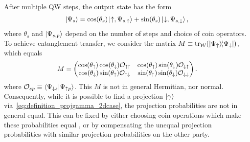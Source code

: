 \documentclass[
	aps, pra,
	superscriptaddress, twocolumn,
	floatfix,
	10pt
]{revtex4-1}
\newcommand{\parTitle}[1]{\noindent{\color{Mahogany}(\emph{#1})}}
\newcommand{\calO}{{\mathcal{O}}}
\newcommand{\calW}{{\mathcal{W}}}
\begin{document}
\parTitle{Multiple steps}
After multiple QW steps, the output state has the form
\begin{equation}
\begin{aligned}
	\ket{\Psi_s} =
	\cos(\theta_s) \ket{\uparrow,\Psi_{s,\uparrow}} +
	\sin(\theta_s) \ket{\downarrow,\Psi_{s,\downarrow}},
\end{aligned}
\end{equation}
where $\theta_s$ and $\ket{\Psi_{s,p}}$ depend on the number of steps and choice of coin operators.
To achieve entanglement transfer, we consider the matrix
$M\equiv \tr_{\calW}(\ketbra{\Psi_\uparrow}{\Psi_\downarrow})$,
which equals
\begin{equation}\scalebox{0.97}{$\displaystyle
	M = \begin{pmatrix}
		\cos(\theta_\uparrow)\cos(\theta_\downarrow) \calO_{\uparrow\uparrow} &
		\cos(\theta_\uparrow)\sin(\theta_{\downarrow}) \calO_{\downarrow\uparrow} \\
		\cos(\theta_\downarrow)\sin(\theta_{\uparrow}) \calO_{\uparrow\downarrow} &
		\sin(\theta_\uparrow)\sin(\theta_\downarrow) \calO_{\downarrow\downarrow}
	\end{pmatrix}.
$}\end{equation}
where
$\calO_{sp}\equiv\braket{\Psi_{\downarrow s}}{\Psi_{\uparrow p}}$.
This $M$ is not in general Hermitian, nor normal. Consequently, while it is possible to find a projection $\ket\gamma$ via~\cref{eq:definition_projgamma_2dcase}, the projection probabilities are not in general equal.
This can be fixed by either choosing coin operations which make these probabilities equal , or by compensating the unequal projection probabilities with similar projection probabilities on the other party.
\end{document}
